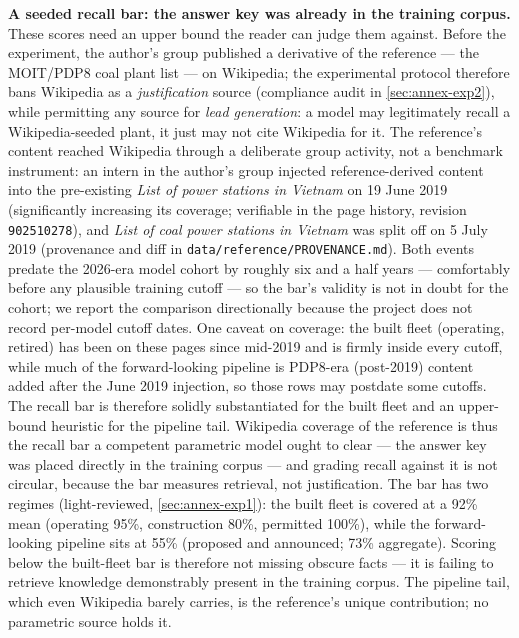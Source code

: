 \documentclass[a4paper,11pt]{article}
\begin{document}
\textbf{A seeded recall bar: the answer key was already in the training
corpus.} These scores need an upper bound the reader can judge them
against. Before the experiment, the author's group published a
derivative of the reference --- the MOIT/PDP8 coal plant list --- on
Wikipedia; the experimental protocol therefore bans Wikipedia as a
\emph{justification} source (compliance audit in \ref{sec:annex-exp2}),
while permitting any source for \emph{lead generation}: a model may
legitimately recall a Wikipedia-seeded plant, it just may not cite
Wikipedia for it. The reference's content reached Wikipedia through a
deliberate group activity, not a benchmark instrument: an intern in the
author's group injected reference-derived content into the pre-existing
\emph{List of power stations in Vietnam} on 19 June 2019 (significantly
increasing its coverage; verifiable in the page history, revision
\texttt{902510278}), and \emph{List of coal power stations in Vietnam}
was split off on 5 July 2019 (provenance and diff in
\texttt{data/reference/PROVENANCE.md}). Both events predate the 2026-era
model cohort by roughly six and a half years --- comfortably before any
plausible training cutoff --- so the bar's validity is not in doubt for
the cohort; we report the comparison directionally because the project
does not record per-model cutoff dates. One caveat on coverage: the
built fleet (operating, retired) has been on these pages since mid-2019
and is firmly inside every cutoff, while much of the forward-looking
pipeline is PDP8-era (post-2019) content added after the June 2019
injection, so those rows may postdate some cutoffs. The recall bar is
therefore solidly substantiated for the built fleet and an upper-bound
heuristic for the pipeline tail. Wikipedia coverage of the reference is
thus the recall bar a competent parametric model ought to clear --- the
answer key was placed directly in the training corpus --- and grading
recall against it is not circular, because the bar measures retrieval,
not justification. The bar has two regimes (light-reviewed,
\ref{sec:annex-exp1}): the built fleet is covered at a 92\% mean
(operating 95\%, construction 80\%, permitted 100\%), while the
forward-looking pipeline sits at 55\% (proposed and announced; 73\%
aggregate). Scoring below the built-fleet bar is therefore not missing
obscure facts --- it is failing to retrieve knowledge demonstrably
present in the training corpus. The pipeline tail, which even Wikipedia
barely carries, is the reference's unique contribution; no parametric
source holds it.
\end{document}
